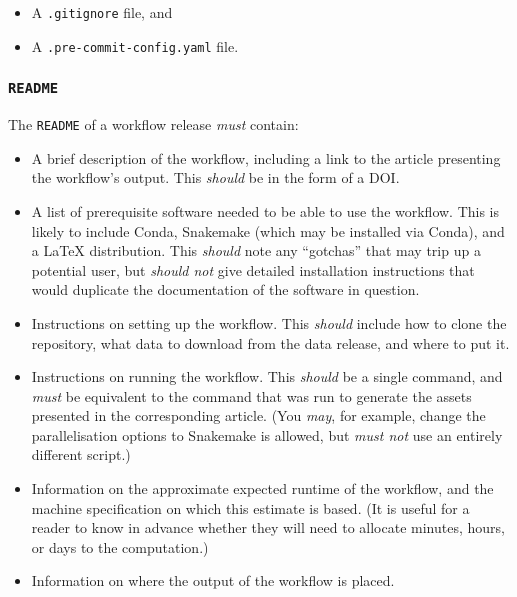 \documentclass{article}
\newcommand\rfcword[1]{\emph{#1}\xspace}
\newcommand\must{\rfcword{must}}
\newcommand\mustnot{\rfcword{must not}}
\newcommand\should{\rfcword{should}}
\newcommand\shouldnot{\rfcword{should not}}
\newcommand\may{\rfcword{may}}
\newcommand\filename[1]{\texttt{#1}\xspace}
\newcommand\readme{\filename{README}\xspace}
\begin{document}
\begin{itemize}
  \item A \filename{.gitignore} file, and
  \item A \filename{.pre-commit-config.yaml} file.
\end{itemize}

\subsubsection{\readme}

The \readme of a workflow release \must contain:

\begin{itemize}
  \item
        A brief description of the workflow,
        including a link to the article presenting the workflow's output.
        This \should be in the form of a DOI\@.
  \item
        A list of prerequisite software needed to be able to use the workflow.
        This is likely to include
        Conda,
        Snakemake
        (which may be installed via Conda),
        and a LaTeX distribution.
        This \should note any ``gotchas'' that may trip up a potential user,
        but \shouldnot give detailed installation instructions
        that would duplicate the documentation of the software in question.
  \item
        Instructions on setting up the workflow.
        This \should include how to clone the repository,
        what data to download from the data release,
        and where to put it.
  \item
        Instructions on running the workflow.
        This \should be a single command,
        and \must be equivalent to the command that was run
        to generate the assets presented in the corresponding article.
        (You \may,
        for example,
        change the parallelisation options to Snakemake is allowed,
        but \mustnot use an entirely different script.)
  \item
        Information on the approximate expected runtime of the workflow,
        and the machine specification on which this estimate is based.
        (It is useful for a reader to know in advance
        whether they will need to allocate
        minutes,
        hours,
        or days
        to the computation.)
  \item
        Information on where the output of the workflow is placed.
\end{itemize}
\end{document}
